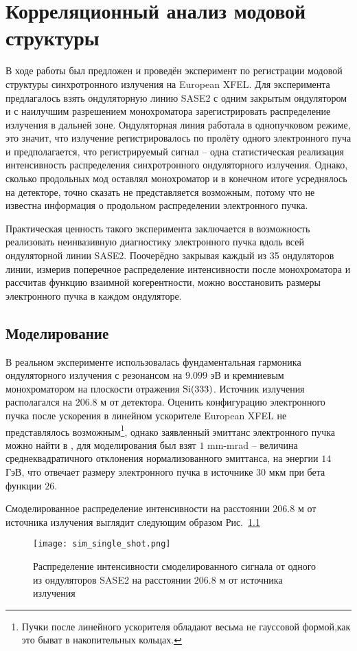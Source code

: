 \chapter{Корреляционный анализ модовой структуры} \label{chapt3}
В ходе работы был предложен и проведён эксперимент по регистрации модовой структуры синхротронного излучения на European XFEL. Для эксперимента предлагалось взять ондуляторную линию SASE2 с одним закрытым ондулятором и с наилучшим разрешением монохроматора зарегистрировать распределение излучения в дальней зоне. Ондуляторная линия работала в однопучковом режиме, это значит, что излучение регистрировалось по пролёту одного электронного пуча и предполагается, что регистрируемый сигнал -- одна статистическая реализация интенсивность распределения синхротронного ондуляторного излучения. Однако, сколько продольных мод оставлял монохроматор и в конечном итоге усреднялось на детекторе, точно сказать не представляется возможным, потому что не известна информация о продольном распределении электронного пучка.

Практическая ценность такого эксперимента заключается в возможность реализовать неинвазивную диагностику электронного пучка вдоль всей ондуляторной линии SASE2. Поочерёдно закрывая каждый из 35 ондуляторов линии, измерив поперечное распределение интенсивности после монохроматора и рассчитав функцию взаимной когерентности, можно восстановить размеры электронного пучка в каждом ондуляторе.

\section{Моделирование}
В реальном эксперименте использовалась фундаментальная гармоника ондуляторного излучения с резонансом на $9.099$ эВ и кремниевым монохроматором на плоскости отражения $\textup{Si}(333)$. Источник излучения располагался на $206.8$ м от детектора. Оценить конфигурацию электронного пучка после ускорения в линейном ускорителе European XFEL не представлялось возможным\footnote{Пучки после линейного ускорителя обладают весьма не гауссовой формой,как это быват в накопительных кольцах.}, однако заявленный эмиттанс электронного пучка можно найти в \cite{schneidmiller_baseline_2018}, для моделирования был взят $1$ mm-mrad -- величина среднеквадратичного отклонения нормализованного эмиттанса, на энергии $14$ ГэВ, что отвечает размеру электронного пучка в источнике $30$ мкм при бета функции $26$. 

Смоделированное распределение интенсивности на расстоянии $206.8$ м от источника излучения выглядит следующим образом Рис.~\ref{fig:sim_single_shot}
\begin{figure}[H] 
	\centering 	\texttt{[image: sim\_single\_shot.png]}
	\caption{Распределение интенсивности смоделированного сигнала от одного из ондуляторов SASE2 на расстоянии $206.8$ м от источника излучения}
	\label{fig:sim_single_shot}
\end{figure}

